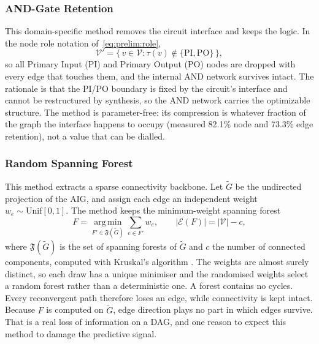 \subsubsection{AND-Gate Retention}
\label{sec:method:sparse:andgate}
This domain-specific method removes the circuit interface and keeps the logic. In the node
role notation of~\eqref{eq:prelim:role},
\begin{equation}
    \mathcal{V}' = \{\, v \in \mathcal{V} :
        \tau(v) \notin \{\mathrm{PI}, \mathrm{PO}\} \,\},
    \label{eq:method:sparse-andgate}
\end{equation}
so all Primary Input (PI) and Primary Output (PO) nodes are dropped with every edge that
touches them, and the internal AND network survives intact. The rationale is that the PI/PO
boundary is fixed by the circuit's interface and cannot be restructured by synthesis, so the
AND network carries the optimizable structure. The method is parameter-free: its compression
is whatever fraction of the graph the interface happens to occupy (measured 82.1\% node and
73.3\% edge retention), not a value that can be dialled.

\subsubsection{Random Spanning Forest}
\label{sec:method:sparse:forest}
This method extracts a sparse connectivity backbone. Let $\tilde{G}$ be the undirected
projection of the AIG, and assign each edge an independent weight
$w_e \sim \mathrm{Unif}[0,1]$. The method keeps the minimum-weight spanning forest
\begin{equation}
    F = \operatorname*{arg\,min}_{F' \in \mathfrak{F}(\tilde{G})}
        \sum_{e \in F'} w_e,
    \qquad
    |\mathcal{E}(F)| = |\mathcal{V}| - c,
    \label{eq:method:sparse-forest}
\end{equation}
where $\mathfrak{F}(\tilde{G})$ is the set of spanning forests of $\tilde{G}$ and $c$ the
number of connected components, computed with Kruskal's algorithm \citep{kruskal1956mst}. The
weights are almost surely distinct, so each draw has a unique minimiser and the randomised
weights select a random forest rather than a deterministic one. A forest contains no cycles.
Every reconvergent path therefore loses an edge, while connectivity is kept intact. Because
$F$ is computed on $\tilde{G}$, edge direction plays no part in which edges survive. That is
a real loss of information on a DAG, and one reason to expect this method to damage the
predictive signal.

